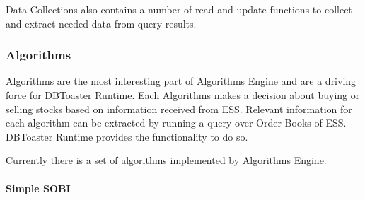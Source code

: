 \documentclass[14pt]{article}
\newcommand{\comment}[1]{}
\begin{document}
Data Collections also contains a number of read and update functions to collect
and extract needed data from query results.

\comment{
\subsubsection{Data Stream}

There are two interactions with outside systems needed to be implemented by the
user. The first interaction is with DBToaster. A system needs to pull
information from the DBToaster runtime. \emph{TODO description of the the
pulling mechanism}.

Another interaction, which needs to be passed to the DBToaster Runtime, is a way
for Runtime to access the data streams relevant to the Engine and over which the
queries needed to be post. This information is specified as a C++ code which is
sent for the compilation to the Runtime to be added to the system.

\subsubsection{External Influence}

If the Engine implements interactive process, which needs to access outside
processes or interact (influence) them then this is interactivity needs also to
be added. In our example Algorithmic Engine can buy and sell stock on our
Exchange Simulation Server. Thus acting like one of the clients of the
server. \emph{TODO describe the system in more details}
}

\subsubsection{Algorithms}

Algorithms are the most interesting part of Algorithms Engine and are a driving
force for DBToaster Runtime. Each Algorithms makes a decision about buying or
selling stocks based on information received from ESS. Relevant information for
each algorithm can be extracted by running a query over Order Books of
ESS. DBToaster Runtime provides the functionality to do so.

Currently there is a set of algorithms implemented by Algorithms Engine. 

\paragraph{Simple SOBI}
\end{document}
